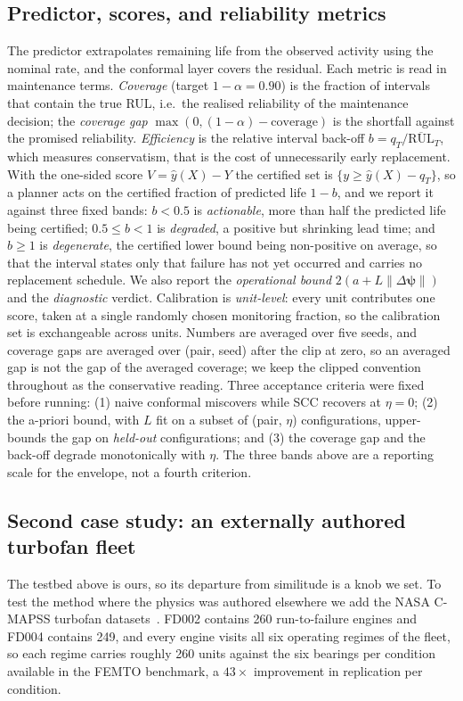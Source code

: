 \documentclass[review,times]{elsarticle}
\theoremstyle{definition}
\theoremstyle{remark}
\begin{document}
\subsection{Predictor, scores, and reliability metrics}\label{sec:metrics}
The predictor extrapolates remaining life from the observed activity using the nominal rate, and the
conformal layer covers the residual. Each metric is read in maintenance terms. \emph{Coverage}
(target $1-\alpha=0.90$) is the fraction of intervals that contain the true RUL, i.e.\ the realised
reliability of the maintenance decision; the \emph{coverage gap} $\max(0,(1-\alpha)-\text{coverage})$
is the shortfall against the promised reliability. \emph{Efficiency} is the relative interval
back-off $b=q_T/\overline{\text{RUL}}_T$, which measures conservatism, that is the cost of
unnecessarily early replacement. With the one-sided score $V=\hat y(X)-Y$ the certified set is
$\{y\ge\hat y(X)-q_T\}$, so a planner acts on the certified fraction of predicted life $1-b$, and
we report it against three fixed bands: $b<0.5$ is
\emph{actionable}, more than half the predicted life being certified; $0.5\le b<1$ is
\emph{degraded}, a positive but shrinking lead time; and $b\ge1$ is \emph{degenerate}, the certified
lower bound being non-positive on average, so that the interval states only that failure has not
yet occurred and carries no replacement schedule. We also report the \emph{operational bound}
$2(a+L\lVert\Delta\boldsymbol\psi\rVert)$ and
the \emph{diagnostic} verdict. Calibration is \emph{unit-level}: every unit contributes one
score, taken at a single randomly chosen monitoring fraction, so the calibration set is
exchangeable across units. Numbers are averaged over five seeds, and coverage gaps are averaged
over (pair, seed) after the clip at zero, so an averaged gap is not the gap of the averaged
coverage; we keep the clipped convention throughout as the conservative reading. Three acceptance
criteria were fixed before running: (1) naive conformal miscovers while SCC recovers at $\eta=0$; (2) the a-priori
bound, with $L$ fit on a subset of (pair, $\eta$) configurations, upper-bounds the gap on
\emph{held-out} configurations; and (3) the coverage gap and the back-off degrade monotonically
with $\eta$. The three bands above are a reporting scale for the envelope, not a fourth criterion.

\subsection{Second case study: an externally authored turbofan fleet}\label{sec:cmapss}
The testbed above is ours, so its departure from similitude is a knob we set. To test the method
where the physics was authored elsewhere we add the NASA C-MAPSS turbofan
datasets~\cite{saxena2008cmapss,saxena2008damage}. FD002 contains 260 run-to-failure engines and
FD004 contains 249, and every engine visits all six operating regimes of the fleet, so each regime
carries roughly 260 units against the six bearings per condition available in the FEMTO benchmark,
a $43\times$ improvement in replication per condition.
\end{document}
